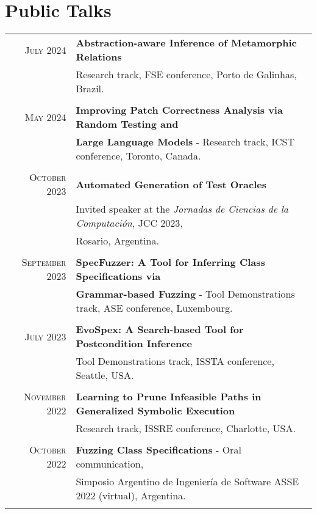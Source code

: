 \documentclass[a4paper,10pt]{article} %
\begin{document}
\section{Public Talks}

\begin{longtable}{rl}

\textsc{July} 2024  & \textbf{Abstraction-aware Inference of Metamorphic Relations} \\ 
& Research track, FSE conference, Porto de Galinhas, Brazil. \\ & \\

\textsc{May} 2024  & \textbf{Improving Patch Correctness Analysis via Random Testing and} \\ 
& \textbf{Large Language Models} - Research track, ICST conference, Toronto, Canada. \\ & \\

\textsc{October} 2023  & \textbf{Automated Generation of Test Oracles} \\ 
& Invited speaker at the \textit{Jornadas de Ciencias de la Computación}, JCC 2023, \\ 
& Rosario, Argentina. \\ & \\

\textsc{September} 2023  & \textbf{SpecFuzzer: A Tool for Inferring Class Specifications via} \\ 
& \textbf{Grammar-based Fuzzing} - Tool Demonstrations track, ASE conference, Luxembourg. \\ & \\

\textsc{July} 2023 & \textbf{EvoSpex: A Search-based Tool for Postcondition Inference} \\ 
& Tool Demonstrations track, ISSTA conference, Seattle, USA. \\ & \\

\textsc{November} 2022 & \textbf{Learning to Prune Infeasible Paths in Generalized Symbolic Execution} \\
& Research track, ISSRE conference, Charlotte, USA. \\ & \\

\textsc{October} 2022 & \textbf{Fuzzing Class Specifications} - Oral communication, \\ 
& Simposio Argentino de Ingeniería de Software ASSE 2022 (virtual), Argentina. \\ & \\


\end{longtable}
\end{document}
